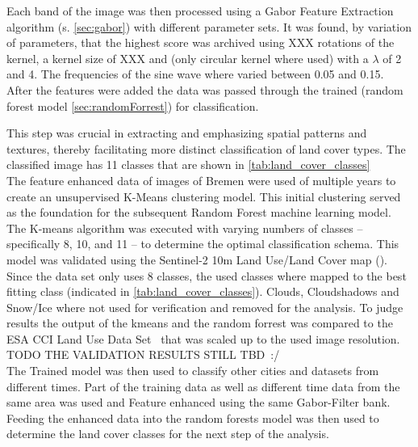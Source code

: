 \documentclass[12pt,a4paper, english]{article}
\begin{document}
    Each band of the image was then processed using a Gabor Feature Extraction algorithm (s. \cref{sec:gabor}) with different parameter sets. 
    It was found, by variation of parameters, that the highest score was archived using XXX 
    rotations of the kernel, a kernel size of XXX
    and (only circular kernel where used) with a $\lambda$ of 2 and 4. %
    The frequencies of the sine wave where varied between 0.05 and 0.15. \\ 
    After the features were added the data was passed through the trained (random forest model \cref{sec:randomForrest}) for classification. 

    This step was crucial in extracting and emphasizing spatial patterns and textures, thereby facilitating more distinct classification of land cover types. %
    The classified image has 11 classes that are shown in \cref{tab:land_cover_classes}
    \\
    The feature enhanced data of images of Bremen%
    were used of multiple years to create an unsupervised K-Means clustering model.%
    This initial clustering served as the foundation for the subsequent Random Forest machine learning model.
    The K-means algorithm was executed with varying numbers of classes – specifically 8, 10, and 11 – to determine the optimal classification schema.
    This model was validated using the Sentinel-2 10m Land Use/Land Cover map (\cite{Zhang}).
    Since the data set only uses 8 classes, the used classes where mapped to the best fitting class (indicated in \cref{tab:land_cover_classes}). 
    Clouds, Cloudshadows and Snow/Ice where not used for verification and removed for the analysis.
    To judge results the output of the kmeans and the random forrest was compared to the ESA CCI Land Use Data Set~\cite{landformclassicationusingfuzzykmeans2000} that was scaled up to the used image resolution. %
    \\
    TODO THE VALIDATION RESULTS STILL TBD~:/%
    \\ 
    The Trained model was then used to classify other cities and datasets from different times. 
    Part of the training data as well as different time data from the same area was used and Feature enhanced using the same Gabor-Filter bank.
    Feeding the enhanced data into the random forests model was then used to determine the land cover classes for the next step of the analysis.
\end{document}
